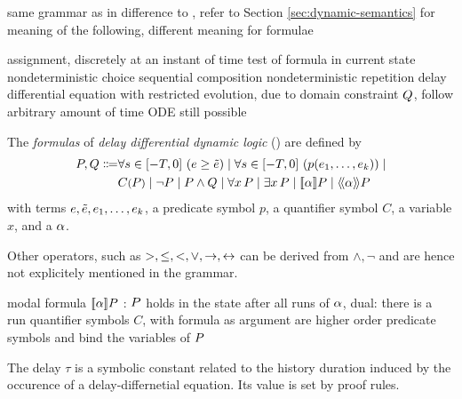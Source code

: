 
    same grammar as in \cite{Platzer15Uniform}
    difference to \dL, refer to Section \ref{sec:dynamic-semantics} for meaning of the following, different meaning for formulae

    assignment, discretely at an instant of time
    test of formula in current state
    nondeterministic choice
    sequential composition
    nondeterministic repetition
    delay differential equation with restricted evolution, due to domain constraint $Q$, follow arbitrary amount of time
    ODE still possible



    \begin{definition}\label{def:syntax-formula}
        The \emph{formulas} of \emph{delay differential dynamic logic} (\ddL) are defined by
        \begin{align}
            \asfml,\bsfml \Coloneqq
                &\holdssince{T}{\astrm\geq\bstrm} \mid
                \holdssince{T}{p(\range{\istrm{1}}{\istrm{k}})} \mid\\
                &\contextapp{C}{\asfml} \mid
                \lnot\asfml \mid
                \asfml\land\bsfml \mid
                \lforall{x}{\asfml} \mid
                \lexists{x}{\asfml} \mid
                \dbox{\asprg}{\asfml} \mid
                \ddiamond{\asprg}{\asfml}
        \end{align}
        with terms $e,\tilde{e},e_{1},\ldots,e_{k}$,
        a predicate symbol $p$, a quantifier symbol $C$, a variable $x$, and a \HP $\alpha$.
        
        Other operators, such as $>,\leq,<,\lor,\rightarrow,\leftrightarrow$ can be derived from $\land,\lnot$ and are hence not explicitely mentioned in the grammar.

        modal formula $\dbox{\asprg}{\asfml}$ : $P$ holds in the state after all runs of $\alpha$, dual: there is a run
        quantifier symbols $C$, with formula as argument are higher order predicate symbols and bind the variables of $P$

        The delay $\tau$ is a symbolic constant related to the history duration induced by the occurence of a delay-differnetial equation. Its value is set by proof rules.
    \end{definition}

